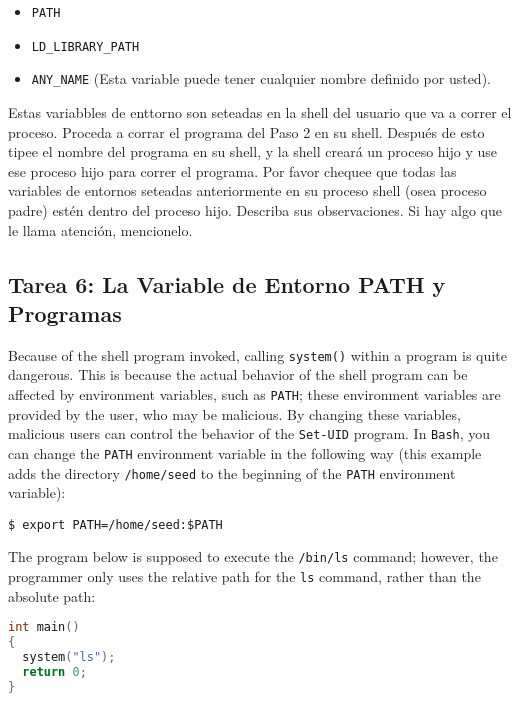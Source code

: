 \begin{itemize}[noitemsep]
\item {\tt PATH}
\item {\tt LD\_LIBRARY\_PATH}
\item {\tt ANY\_NAME} (Esta variable puede tener cualquier nombre definido por usted).
\end{itemize}

Estas variabbles de enttorno son seteadas en la shell del usuario que va a correr el proceso. Proceda a corrar el programa \setuid del Paso 2 en su shell. Después de esto tipee el nombre del programa en su shell, y la shell creará un proceso hijo y use ese proceso hijo para correr el programa. Por favor chequee que todas las variables de entornos seteadas anteriormente en su proceso shell (osea proceso padre) estén dentro del proceso \setuid hijo. Describa sus observaciones. Si hay algo que le llama atención, mencionelo.



\subsection{Tarea 6: La Variable de Entorno PATH y Programas \setuid }

Because of the shell program invoked, calling {\tt system()}
within a \setuid program is quite dangerous. This is because the actual behavior of the
shell program can be affected by environment variables, such
as {\tt PATH}; these environment variables are provided by the user, who
may be malicious.  By changing these variables, malicious users can control
the behavior of the {\tt Set-UID} program. In {\tt Bash}, you can
change the {\tt PATH} environment variable in the following way (this example
adds the directory {\tt /home/seed} to the beginning of the {\tt PATH} environment variable):


\begin{lstlisting}
$ export PATH=/home/seed:$PATH
\end{lstlisting}



The \setuid program below is supposed to execute the {\tt /bin/ls} command;
however, the programmer only uses the relative path for the {\tt ls}
command, rather than the absolute path:

\begin{lstlisting}[language=C]
int main()
{
  system("ls");
  return 0;
}
\end{lstlisting}

